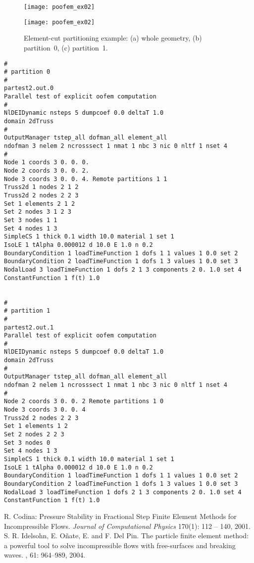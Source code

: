 \documentclass[a4paper]{article}
\begin{document}
\begin{figure}[htb]
\begin{htmlonly}
  \centerline{\texttt{[image: poofem\_ex02]}}
\end{htmlonly}
\centerline{\texttt{[image: poofem\_ex02]}}
\caption{Element-cut partitioning example: (a) whole geometry,
(b) partition~0, (c) partition~1.}
\label{elmentcut-ex02}
\end{figure}

\begin{verbatim}
#
# partition 0
#
partest2.out.0
Parallel test of explicit oofem computation
#
NlDEIDynamic nsteps 5 dumpcoef 0.0 deltaT 1.0
domain 2dTruss
#
OutputManager tstep_all dofman_all element_all
ndofman 3 nelem 2 ncrosssect 1 nmat 1 nbc 3 nic 0 nltf 1 nset 4
#
Node 1 coords 3 0. 0. 0.
Node 2 coords 3 0. 0. 2.
Node 3 coords 3 0. 0. 4. Remote partitions 1 1
Truss2d 1 nodes 2 1 2
Truss2d 2 nodes 2 2 3
Set 1 elements 2 1 2
Set 2 nodes 3 1 2 3
Set 3 nodes 1 1
Set 4 nodes 1 3
SimpleCS 1 thick 0.1 width 10.0 material 1 set 1
IsoLE 1 tAlpha 0.000012 d 10.0 E 1.0 n 0.2
BoundaryCondition 1 loadTimeFunction 1 dofs 1 1 values 1 0.0 set 2
BoundaryCondition 2 loadTimeFunction 1 dofs 1 3 values 1 0.0 set 3
NodalLoad 3 loadTimeFunction 1 dofs 2 1 3 components 2 0. 1.0 set 4
ConstantFunction 1 f(t) 1.0


#
# partition 1
#
partest2.out.1
Parallel test of explicit oofem computation
#
NlDEIDynamic nsteps 5 dumpcoef 0.0 deltaT 1.0
domain 2dTruss
#
OutputManager tstep_all dofman_all element_all
ndofman 2 nelem 1 ncrosssect 1 nmat 1 nbc 3 nic 0 nltf 1 nset 4
#
Node 2 coords 3 0. 0. 2 Remote partitions 1 0
Node 3 coords 3 0. 0. 4
Truss2d 2 nodes 2 2 3
Set 1 elements 1 2
Set 2 nodes 2 2 3
Set 3 nodes 0
Set 4 nodes 1 3
SimpleCS 1 thick 0.1 width 10.0 material 1 set 1
IsoLE 1 tAlpha 0.000012 d 10.0 E 1.0 n 0.2
BoundaryCondition 1 loadTimeFunction 1 dofs 1 1 values 1 0.0 set 2
BoundaryCondition 2 loadTimeFunction 1 dofs 1 3 values 1 0.0 set 3
NodalLoad 3 loadTimeFunction 1 dofs 2 1 3 components 2 0. 1.0 set 4
ConstantFunction 1 f(t) 1.0
\end{verbatim}

\begin{thebibliography}{9}
 R. Codina: Pressure Stability in Fractional Step Finite Element Methods for Incompressible Flows. {\em Journal of Computational Physics} 170(1): 112 -- 140, 2001.
 S. R. Idelsohn, E. O\~nate, E. and F. Del Pin.
\newblock The particle finite element method: a powerful tool to solve incompressible flows with free-surfaces and breaking waves.
, 61: 964--989, 2004.
\end{thebibliography}
\end{document}
